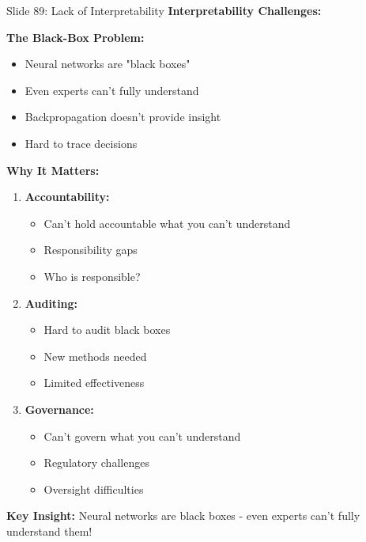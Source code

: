 \documentclass[8pt]{beamer}
\begin{document}
	\begin{frame}{Slide 89: Lack of Interpretability}
		\fontsize{6.5}{7.5}\selectfont
		\textbf{Interpretability Challenges:}
		
		\vspace{0.1cm}
		\textbf{The Black-Box Problem:}
		\begin{itemize}
			\item Neural networks are "black boxes"
			\item Even experts can't fully understand
			\item Backpropagation doesn't provide insight
			\item Hard to trace decisions
		\end{itemize}
		
		\vspace{0.1cm}
		\textbf{Why It Matters:}
		\begin{enumerate}
			\item \textbf{Accountability:}
			\begin{itemize}
				\item Can't hold accountable what you can't understand
				\item Responsibility gaps
				\item Who is responsible?
			\end{itemize}
			\item \textbf{Auditing:}
			\begin{itemize}
				\item Hard to audit black boxes
				\item New methods needed
				\item Limited effectiveness
			\end{itemize}
			\item \textbf{Governance:}
			\begin{itemize}
				\item Can't govern what you can't understand
				\item Regulatory challenges
				\item Oversight difficulties
			\end{itemize}
		\end{enumerate}
		
		\textcolor{myblue}{\textbf{Key Insight:}} Neural networks are \textcolor{myblue}{black boxes} - even experts can't fully understand them!
	\end{frame}
	
\end{document}
